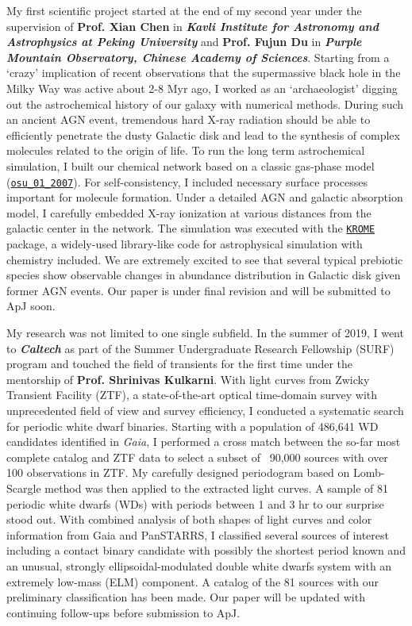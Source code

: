 \documentclass[11pt, a4paper]{awesome-cv} %
\begin{document}
\begin{cvletter}
My first scientific project started at the end of my second year under the supervision of \textbf{Prof. Xian Chen} in \textbf{\textit{Kavli Institute for Astronomy and Astrophysics at Peking University}} and \textbf{Prof. Fujun Du} in \textbf{\textit{Purple Mountain Observatory, Chinese Academy of Sciences}}. Starting from a `crazy' implication of recent observations that the supermassive black hole in the Milky Way was active about 2-8 Myr ago, I worked as an `archaeologist' digging out the astrochemical history of our galaxy with numerical methods. During such an ancient AGN event, tremendous hard X-ray radiation should be able to efficiently penetrate the dusty Galactic disk and lead to the synthesis of complex molecules related to the origin of life. To run the long term astrochemical simulation, I built our chemical network based on a classic gas-phase model (\href{http://faculty.virginia.edu/ericherb/research_files/osu_01_2007}{\texttt{osu\_01\_2007}}). For self-consistency, I included necessary surface processes important for molecule formation. Under a detailed AGN and galactic absorption model, I carefully embedded X-ray ionization at various distances from the galactic center in the network. The simulation was executed with the \href{http://kromepackage.org}{\texttt{KROME}} package, a widely-used library-like code for astrophysical simulation with chemistry included. We are extremely excited to see that several typical prebiotic species show observable changes in abundance distribution in Galactic disk given former AGN events. Our paper is under final revision and will be submitted to ApJ soon.

My research was not limited to one single subfield. In the summer of 2019, I went to \textbf{\textit{Caltech}} as part of the Summer Undergraduate Research Fellowship (SURF) program and touched the field of transients for the first time under the mentorship of \textbf{Prof. Shrinivas Kulkarni}. With light curves from Zwicky Transient Facility (ZTF), a state-of-the-art optical time-domain survey with unprecedented field of view and survey efficiency, I conducted a systematic search for periodic white dwarf binaries. Starting with a population of 486,641 WD candidates identified in \textit{Gaia}, I performed a cross match between the so-far most complete catalog and ZTF data to select a subset of ~90,000 sources with over 100 observations in ZTF. My carefully designed periodogram based on Lomb-Scargle method was then applied to the extracted light curves. A sample of 81 periodic white dwarfs (WDs) with periods between 1 and 3 hr to our surprise stood out. With combined analysis of both shapes of light curves and color information from Gaia and PanSTARRS, I classified several sources of interest including a contact binary candidate with possibly the shortest period known and an unusual, strongly ellipsoidal-modulated double white dwarfs system with an extremely low-mass (ELM) component. A catalog of the 81 sources with our preliminary classification has been made. Our paper will be updated with continuing follow-ups before submission to ApJ.


\end{cvletter}
\end{document}
